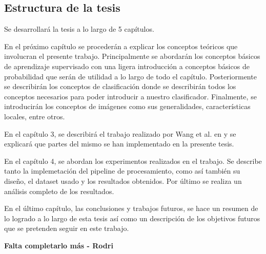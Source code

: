 \subsection{Estructura de la tesis}

	Se desarrollará la tesis a lo largo de 5 capítulos.
	
	En el próximo capítulo se procederán a explicar los conceptos teóricos que involucran el presente trabajo. Principalmente se abordarán los conceptos básicos de aprendizaje supervisado con una ligera introducción a conceptos básicos de probabilidad que serán de utilidad a lo largo de todo el capítulo. Posteriormente se describirán los conceptos de clasificación donde se describirán todos los conceptos necesarios para poder introducir a nuestro clasificador. Finalmente, se introducirán los conceptos de imágenes como sus generalidades, características locales, entre otros.
	
	 En el capítulo 3, se describirá el trabajo realizado por Wang et al. en \cite{wang} y se explicará que partes del mismo se han implementado en la presente tesis.

	En el capítulo 4, se abordan los experimentos realizados en el trabajo. Se describe tanto la implemetación del pipeline de procesamiento, como así también su diseño, el dataset usado y los resultados obtenidos. Por último se realiza un análisis completo de los resultados.
	
	En el último capítulo, las conclusiones y trabajos futuros, se hace un resumen de lo logrado a lo largo de esta tesis así como un descripción de los objetivos futuros que se pretenden seguir en este trabajo.
	
	\textbf{Falta completarlo más - Rodri}